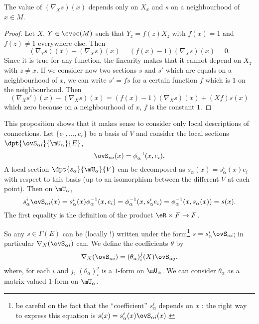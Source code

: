 \begin{proposition}     \label{PROPooWZYOooEVhgFt}
The value of $(\nabla_Xs)(x)$ depends only on $X_x$ and $s$ on a neighbourhood of $x\in M$.
\end{proposition}

\begin{proof}
Let $X$, $Y\in\cvec(M)$ such that $Y_z=f(z)X_z$  with $f(x)=1$ and $f(z)\neq 1$ everywhere else. Then
\[
  (\nabla_Ys)(x)-(\nabla_Xs)(x)=(f(x)-1)(\nabla_Xs)(x)=0.
\]
Since it is true for any function, the linearity makes that it cannot depend on $X_z$ with $z\neq x$. If we consider now two sections $s$ and $s'$ which are equals on a neighbourhood of $x$, we can write $s'=fs$ for a certain function $f$ which is $1$ on the neighbourhood. Then
\[
  (\nabla_Xs')(x)-(\nabla_Xs)(x)=(f(x)-1)(\nabla_Xs)(x)+(Xf)s(x)
\]
which zero because on a neighbourhood of $x$, $f$ is the constant $1$.
\end{proof}

This proposition shows that it makes sense to consider only local descriptions of connections.  Let $\{e_1,\ldots,e_r\}$ be a basis of $V$ and consider the local sections $\dpt{\ovS_{\alpha i}}{\mU_{\alpha}}{E}$,
\[
  \ovS_{\alpha i}(x)=\phi_{\alpha}^{-1}(x,e_i).
\]
A local section $\dpt{s_{\alpha}}{\mU_{\alpha}}{V}$ can be decomposed as $s_{\alpha}(x)=s_{\alpha}^i(x)e_i$ with respect to this basis (up to an isomorphism between the different $V$ at each point). Then on $\mU_{\alpha}$,
\begin{equation}
  s_{\alpha}^i\ovS_{\alpha i}(x)=s_{\alpha}^i(x)\phi_{\alpha}^{-1}(x,e_i)
                              =\phi_{\alpha}^{-1}(x,s_{\alpha}^ie_i)
			      =\phi_{\alpha}^{-1}(x,s_{\alpha}(x))
			      =s(x).
\end{equation}
The first equality is the definition of the product $\eR\times F\to F$.

So any $s\in\Gamma(E)$ can be (locally !) written under the form\footnote{be careful on the fact that the ``coefficient'' $s_{\alpha}^i$ depends on $x$ : the right way to express this equation is $s(x)=s^i_{\alpha}(x)\ovS_{\alpha i}(x)$.} $s=s_{\alpha}^i\ovS_{\alpha i}$; in particular $\nabla_X(\ovS_{\alpha i})$ can. We define the coefficients $\theta$ by
\begin{equation}
 \nabla_X(\ovS_{\alpha i})=(\theta_{\alpha})^j_i(X)\ovS_{\alpha j}.
\end{equation}
where, for each $i$ and $j$, $(\theta_{\alpha})^j_i$ is a $1$-form on $\mU_{\alpha}$. We can consider $\theta_{\alpha}$ as a matrix-valued $1$-form on $\mU_{\alpha}$.

